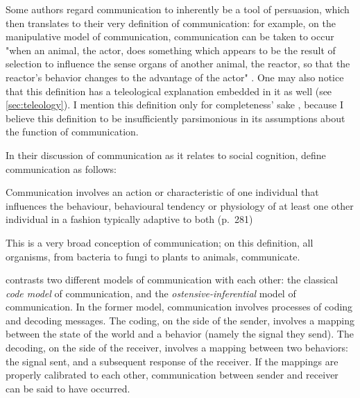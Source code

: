 Some authors regard communication to inherently be a tool of persuasion, which then translates to their very definition of communication: for example, on the manipulative model of communication, communication can be taken to occur "when an animal, the actor, does something which appears to be the result of selection to influence the sense organs of another animal, the reactor, so that the reactor's behavior changes to the advantage of the actor" \citep[p.~283]{DawkinsKrebs78}.
One may also notice that this definition has a teleological explanation embedded in it as well (see \cref{sec:teleology}).
I mention this definition only for completeness' sake , because I believe this definition to be insufficiently parsimonious in its assumptions about the function of communication.

In their discussion of communication as it relates to social cognition, \citet{Freeberg19} define communication as follows:
\begin{quoting}
    Communication involves an action or characteristic of one individual that influences the behaviour, behavioural tendency or physiology of at least one other individual in a fashion typically adaptive to both
    \hfill (p.~281)
\end{quoting}
This is a very broad conception of communication; on this definition, all organisms, from bacteria to fungi to plants to animals, communicate.

\citet{Scott-Phillips18-communication, Scott-Phillips15-primate} contrasts two different models of communication with each other: the classical \emph{code model} of communication, and the \emph{ostensive-inferential} model of communication.
In the former model, communication involves processes of coding and decoding messages. The coding, on the side of the sender, involves a mapping between the state of the world and a behavior (namely the signal they send). The decoding, on the side of the receiver, involves a mapping between two behaviors: the signal sent, and a subsequent response of the receiver. If the mappings are properly calibrated to each other, communication between sender and receiver can be said to have occurred.

